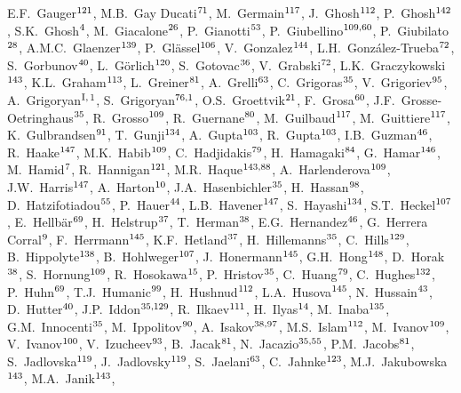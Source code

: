 \begin{flushleft}
E.F.~Gauger$^{\rm 121}$, 
M.B.~Gay Ducati$^{\rm 71}$, 
M.~Germain$^{\rm 117}$, 
J.~Ghosh$^{\rm 112}$, 
P.~Ghosh$^{\rm 142}$, 
S.K.~Ghosh$^{\rm 4}$, 
M.~Giacalone$^{\rm 26}$, 
P.~Gianotti$^{\rm 53}$, 
P.~Giubellino$^{\rm 109,60}$, 
P.~Giubilato$^{\rm 28}$, 
A.M.C.~Glaenzer$^{\rm 139}$, 
P.~Gl\"{a}ssel$^{\rm 106}$, 
V.~Gonzalez$^{\rm 144}$, 
\mbox{L.H.~Gonz\'{a}lez-Trueba}$^{\rm 72}$, 
S.~Gorbunov$^{\rm 40}$, 
L.~G\"{o}rlich$^{\rm 120}$, 
S.~Gotovac$^{\rm 36}$, 
V.~Grabski$^{\rm 72}$, 
L.K.~Graczykowski$^{\rm 143}$, 
K.L.~Graham$^{\rm 113}$, 
L.~Greiner$^{\rm 81}$, 
A.~Grelli$^{\rm 63}$, 
C.~Grigoras$^{\rm 35}$, 
V.~Grigoriev$^{\rm 95}$, 
A.~Grigoryan$^{\rm I,}$$^{\rm 1}$, 
S.~Grigoryan$^{\rm 76,1}$, 
O.S.~Groettvik$^{\rm 21}$, 
F.~Grosa$^{\rm 60}$, 
J.F.~Grosse-Oetringhaus$^{\rm 35}$, 
R.~Grosso$^{\rm 109}$, 
R.~Guernane$^{\rm 80}$, 
M.~Guilbaud$^{\rm 117}$, 
M.~Guittiere$^{\rm 117}$, 
K.~Gulbrandsen$^{\rm 91}$, 
T.~Gunji$^{\rm 134}$, 
A.~Gupta$^{\rm 103}$, 
R.~Gupta$^{\rm 103}$, 
I.B.~Guzman$^{\rm 46}$, 
R.~Haake$^{\rm 147}$, 
M.K.~Habib$^{\rm 109}$, 
C.~Hadjidakis$^{\rm 79}$, 
H.~Hamagaki$^{\rm 84}$, 
G.~Hamar$^{\rm 146}$, 
M.~Hamid$^{\rm 7}$, 
R.~Hannigan$^{\rm 121}$, 
M.R.~Haque$^{\rm 143,88}$, 
A.~Harlenderova$^{\rm 109}$, 
J.W.~Harris$^{\rm 147}$, 
A.~Harton$^{\rm 10}$, 
J.A.~Hasenbichler$^{\rm 35}$, 
H.~Hassan$^{\rm 98}$, 
D.~Hatzifotiadou$^{\rm 55}$, 
P.~Hauer$^{\rm 44}$, 
L.B.~Havener$^{\rm 147}$, 
S.~Hayashi$^{\rm 134}$, 
S.T.~Heckel$^{\rm 107}$, 
E.~Hellb\"{a}r$^{\rm 69}$, 
H.~Helstrup$^{\rm 37}$, 
T.~Herman$^{\rm 38}$, 
E.G.~Hernandez$^{\rm 46}$, 
G.~Herrera Corral$^{\rm 9}$, 
F.~Herrmann$^{\rm 145}$, 
K.F.~Hetland$^{\rm 37}$, 
H.~Hillemanns$^{\rm 35}$, 
C.~Hills$^{\rm 129}$, 
B.~Hippolyte$^{\rm 138}$, 
B.~Hohlweger$^{\rm 107}$, 
J.~Honermann$^{\rm 145}$, 
G.H.~Hong$^{\rm 148}$, 
D.~Horak$^{\rm 38}$, 
S.~Hornung$^{\rm 109}$, 
R.~Hosokawa$^{\rm 15}$, 
P.~Hristov$^{\rm 35}$, 
C.~Huang$^{\rm 79}$, 
C.~Hughes$^{\rm 132}$, 
P.~Huhn$^{\rm 69}$, 
T.J.~Humanic$^{\rm 99}$, 
H.~Hushnud$^{\rm 112}$, 
L.A.~Husova$^{\rm 145}$, 
N.~Hussain$^{\rm 43}$, 
D.~Hutter$^{\rm 40}$, 
J.P.~Iddon$^{\rm 35,129}$, 
R.~Ilkaev$^{\rm 111}$, 
H.~Ilyas$^{\rm 14}$, 
M.~Inaba$^{\rm 135}$, 
G.M.~Innocenti$^{\rm 35}$, 
M.~Ippolitov$^{\rm 90}$, 
A.~Isakov$^{\rm 38,97}$, 
M.S.~Islam$^{\rm 112}$, 
M.~Ivanov$^{\rm 109}$, 
V.~Ivanov$^{\rm 100}$, 
V.~Izucheev$^{\rm 93}$, 
B.~Jacak$^{\rm 81}$, 
N.~Jacazio$^{\rm 35,55}$, 
P.M.~Jacobs$^{\rm 81}$, 
S.~Jadlovska$^{\rm 119}$, 
J.~Jadlovsky$^{\rm 119}$, 
S.~Jaelani$^{\rm 63}$, 
C.~Jahnke$^{\rm 123}$, 
M.J.~Jakubowska$^{\rm 143}$, 
M.A.~Janik$^{\rm 143}$, 
$$
\end{flushleft}
